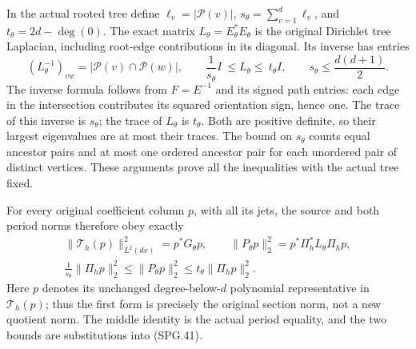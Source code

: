 In the actual rooted tree define
\(\ell_v=|\mathcal P(v)|\),
\(s_\theta=\sum_{v=1}^d\ell_v\), and
\(t_\theta=2d-\deg(0)\). The exact matrix
\(L_\theta=E_\theta^*E_\theta\) is the original Dirichlet
tree Laplacian, including root-edge contributions in its diagonal.
Its inverse has entries
\[
 (L_\theta^{-1})_{vw}=|\mathcal P(v)\cap\mathcal P(w)|,
 \qquad
 \frac1{s_\theta}I\ \le L_\theta\le\ t_\theta I,
 \qquad
 s_\theta\le\frac{d(d+1)}2.
 \tag{SPG.41}\label{eq:spg-exact-tree-metric}
\]
The inverse formula follows from \(F=E^{-1}\) and its signed
path entries: each edge in the intersection contributes its squared
orientation sign, hence one. The trace of this inverse is
\(s_\theta\); the trace of \(L_\theta\) is
\(t_\theta\). Both are positive definite, so their largest
eigenvalues are at most their traces. The bound on \(s_\theta\)
counts equal ancestor pairs and at most one ordered ancestor pair
for each unordered pair of distinct vertices. These arguments prove
all the inequalities with the actual tree fixed.

For every original coefficient column \(p\), with all its jets,
the source and both period norms therefore obey exactly
\[
 \begin{gathered}
 \|\mathcal T_h(p)\|_{L^2(dx)}^2=p^*G_\theta p,\qquad
 \|P_\theta p\|_2^2=p^*\Pi_h^*L_\theta\Pi_h p,\\
 \frac1{s_\theta}\|\Pi_h p\|_2^2
      \le\|P_\theta p\|_2^2
      \le t_\theta\|\Pi_h p\|_2^2.
 \end{gathered}
 \tag{SPG.42}\label{eq:spg-period-source-norms}
\]
Here \(p\) denotes its unchanged degree-below-\(d\) polynomial
representative in \(\mathcal T_h(p)\); thus the first form is
precisely the original section norm, not a new quotient norm.
The middle identity is the actual period equality, and the two
bounds are substitutions into (SPG.41).

